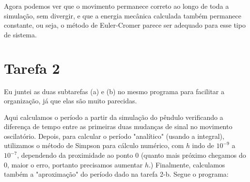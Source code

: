 \documentclass[12pt,a4paper]{article}
\begin{document}
Agora podemos ver que o movimento permanece correto ao longo de toda a simulação, sem divergir, e que a energia mecânica calculada também permanece constante, ou seja, o método de Euler-Cromer parece ser adequado para esse tipo de sistema.

\section{Tarefa 2}
Eu juntei as duas subtarefas (a) e (b) no mesmo programa para facilitar a organização, já que elas são muito parecidas.

Aqui calculamos o período a partir da simulação do pêndulo verificando a diferença de tempo entre as primeiras duas mudanças de sinal no movimento oscilatório. Depois, para calcular o período "analítico" (usando a integral), utilizamos o método de Simpson para cálculo numérico, com $h$ indo de $10^{-9}$ a $10^{-7}$, dependendo da proximidade ao ponto 0 (quanto mais próximo chegamos do 0, maior o erro, portanto precisamos aumentar $h$.) Finalmente, calculamos também a "aproximação" do período dado na tarefa 2-b. Segue o programa:
\end{document}
